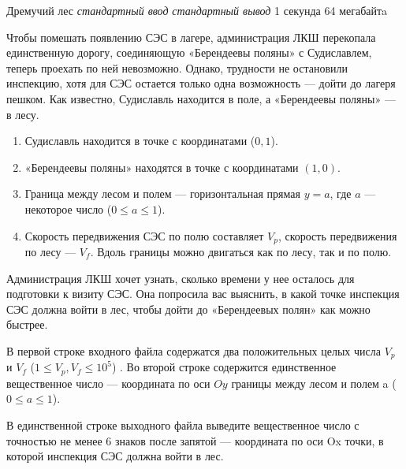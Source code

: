 \begin{problem}%
{Дремучий лес}%
{\textsl{стандартный ввод}}%
{\textsl{стандартный вывод}}%
{1 секунда}%
{64 мегабайтa}{}

Чтобы помешать появлению СЭС в лагере, администрация ЛКШ перекопала единственную дорогу, соединяющую «Берендеевы поляны» с Судиславлем, теперь проехать по ней невозможно. Однако, трудности не остановили инспекцию, хотя для СЭС остается только одна возможность — дойти до лагеря пешком. Как известно, Судиславль находится в поле, а «Берендеевы поляны» — в лесу.

\begin{enumerate}
\item Судиславль находится в точке с координатами ($0, 1$).
\item «Берендеевы поляны» находятся в точке с координатами $(1, 0)$.
\item Граница между лесом и полем — горизонтальная прямая $y = a$, где $a$ — некоторое число ($0 \le a \le 1$).
\item Скорость передвижения СЭС по полю составляет $V_p$, скорость передвижения по лесу — $V_f$. Вдоль границы можно двигаться как по лесу, так и по полю.
\end{enumerate}

Администрация ЛКШ хочет узнать, сколько времени у нее осталось для подготовки к визиту СЭС. Она попросила вас выяснить, в какой точке инспекция СЭС должна войти в лес, чтобы дойти до «Берендеевых полян» как можно быстрее.

\InputFile

В первой строке входного файла содержатся два положительных целых числа $V_p$  и $V_f$  ($1 \le V_p, V_f \le 10^5$) . Во второй строке содержится единственное вещественное число — координата по оси $Oy$  границы между лесом и полем a  ($0 \le a \le 1$). 

\OutputFile

В единственной строке выходного файла выведите вещественное число с точностью не менее $6$ знаков после запятой — координата по оси Ox точки, в которой инспекция СЭС должна войти в лес.

\Examples

\begin{example}
%
%
\end{example}
\end{problem}
